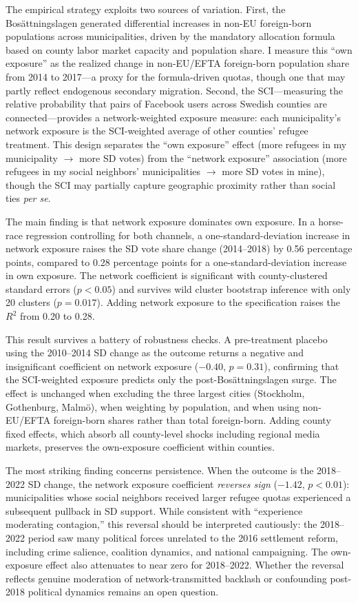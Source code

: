 \documentclass[12pt]{article}
\begin{document}
The empirical strategy exploits two sources of variation. First, the Bos\"{a}ttningslagen generated differential increases in non-EU foreign-born populations across municipalities, driven by the mandatory allocation formula based on county labor market capacity and population share. I measure this ``own exposure'' as the realized change in non-EU/EFTA foreign-born population share from 2014 to 2017---a proxy for the formula-driven quotas, though one that may partly reflect endogenous secondary migration. Second, the SCI---measuring the relative probability that pairs of Facebook users across Swedish counties are connected---provides a network-weighted exposure measure: each municipality's network exposure is the SCI-weighted average of other counties' refugee treatment. This design separates the ``own exposure'' effect (more refugees in my municipality $\to$ more SD votes) from the ``network exposure'' association (more refugees in my social neighbors' municipalities $\to$ more SD votes in mine), though the SCI may partially capture geographic proximity rather than social ties \emph{per se}.

The main finding is that network exposure dominates own exposure. In a horse-race regression controlling for both channels, a one-standard-deviation increase in network exposure raises the SD vote share change (2014--2018) by 0.56 percentage points, compared to 0.28 percentage points for a one-standard-deviation increase in own exposure. The network coefficient is significant with county-clustered standard errors ($p < 0.05$) and survives wild cluster bootstrap inference with only 20 clusters ($p = 0.017$). Adding network exposure to the specification raises the $R^2$ from 0.20 to 0.28.

This result survives a battery of robustness checks. A pre-treatment placebo using the 2010--2014 SD change as the outcome returns a negative and insignificant coefficient on network exposure ($-0.40$, $p = 0.31$), confirming that the SCI-weighted exposure predicts only the post-Bos\"{a}ttningslagen surge. The effect is unchanged when excluding the three largest cities (Stockholm, Gothenburg, Malm\"{o}), when weighting by population, and when using non-EU/EFTA foreign-born shares rather than total foreign-born. Adding county fixed effects, which absorb all county-level shocks including regional media markets, preserves the own-exposure coefficient within counties.

The most striking finding concerns persistence. When the outcome is the 2018--2022 SD change, the network exposure coefficient \emph{reverses sign} ($-1.42$, $p < 0.01$): municipalities whose social neighbors received larger refugee quotas experienced a subsequent pullback in SD support. While consistent with ``experience moderating contagion,'' this reversal should be interpreted cautiously: the 2018--2022 period saw many political forces unrelated to the 2016 settlement reform, including crime salience, coalition dynamics, and national campaigning. The own-exposure effect also attenuates to near zero for 2018--2022. Whether the reversal reflects genuine moderation of network-transmitted backlash or confounding post-2018 political dynamics remains an open question.
\end{document}
